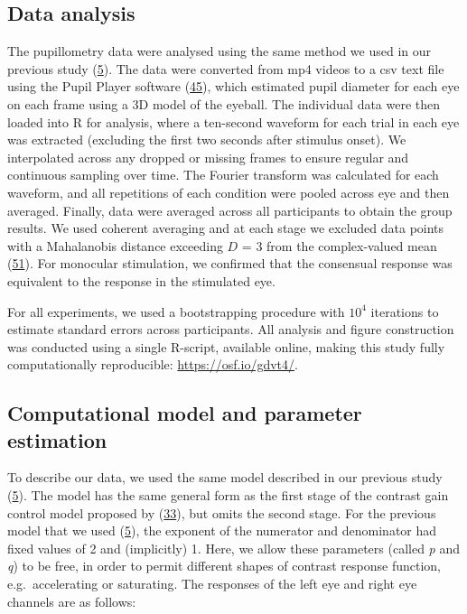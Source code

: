 \documentclass[
]{article}
\begin{document}
\hypertarget{data-analysis}{%
\subsection{Data analysis}\label{data-analysis}}

The pupillometry data were analysed using the same method we used in our previous study (\protect\hyperlink{ref-Segala2023}{5}). The data were converted from mp4 videos to a csv text file using the Pupil Player software (\protect\hyperlink{ref-Kassner2014}{45}), which estimated pupil diameter for each eye on each frame using a 3D model of the eyeball. The individual data were then loaded into R for analysis, where a ten-second waveform for each trial in each eye was extracted (excluding the first two seconds after stimulus onset). We interpolated across any dropped or missing frames to ensure regular and continuous sampling over time. The Fourier transform was calculated for each waveform, and all repetitions of each condition were pooled across eye and then averaged. Finally, data were averaged across all participants to obtain the group results. We used coherent averaging and at each stage we excluded data points with a Mahalanobis distance exceeding \(D\) = 3 from the complex-valued mean (\protect\hyperlink{ref-Baker2021}{51}). For monocular stimulation, we confirmed that the consensual response was equivalent to the response in the stimulated eye.

For all experiments, we used a bootstrapping procedure with \ensuremath{10^{4}} iterations to estimate standard errors across participants. All analysis and figure construction was conducted using a single R-script, available online, making this study fully computationally reproducible: \url{https://osf.io/gdvt4/}.

\hypertarget{computational-model-and-parameter-estimation}{%
\subsection{Computational model and parameter estimation}\label{computational-model-and-parameter-estimation}}

To describe our data, we used the same model described in our previous study (\protect\hyperlink{ref-Segala2023}{5}). The model has the same general form as the first stage of the contrast gain control model proposed by (\protect\hyperlink{ref-Meese2006}{33}), but omits the second stage. For the previous model that we used (\protect\hyperlink{ref-Segala2023}{5}), the exponent of the numerator and denominator had fixed values of 2 and (implicitly) 1. Here, we allow these parameters (called \emph{p} and \emph{q}) to be free, in order to permit different shapes of contrast response function, e.g.~accelerating or saturating. The responses of the left eye and right eye channels are as follows:
\end{document}
